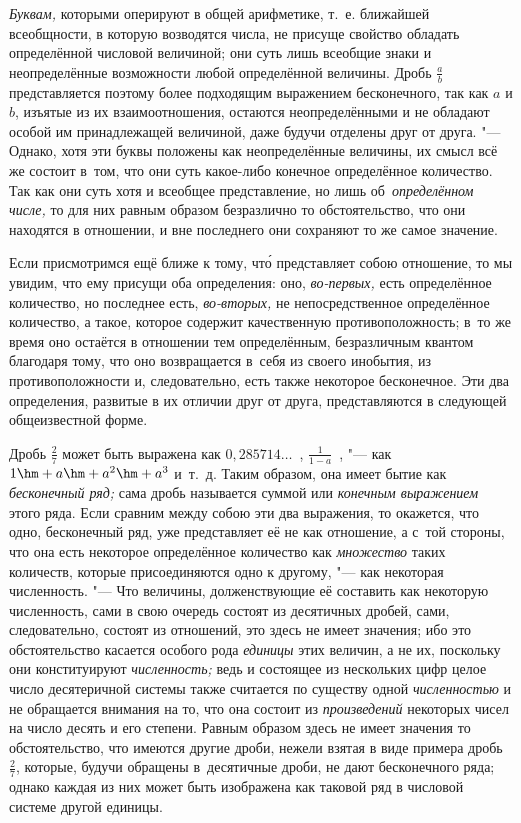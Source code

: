 {\em Буквам,} которыми оперируют в общей арифметике, т.~е. ближайшей
всеобщности, в которую возводятся числа, не присуще свойство обладать
определённой числовой величиной; они суть лишь всеобщие знаки и неопределённые
возможности любой определённой величины. Дробь $\frac a b$ представляется
поэтому более подходящим выражением бесконечного, так как $a$ и $b$,
изъятые из их взаимоотношения, остаются неопределёнными и не обладают особой им
принадлежащей величиной, даже будучи отделены друг от друга. "--- Однако, хотя
эти буквы положены как неопределённые величины, их смысл всё же состоит в~том,
что они суть какое-либо конечное определённое количество. Так как они суть хотя
и всеобщее представление, но лишь об~{\em определённом числе,} то для них
равным образом безразлично то обстоятельство, что они находятся в отношении,
и вне последнего они сохраняют то же самое значение.

Если присмотримся ещё ближе к тому, чт\'{о} представляет собою отношение, то мы
увидим, что ему присущи оба определения: оно, {\em во-первых,} есть
определённое количество, но последнее есть, {\em во-вторых,} не
непосредственное определённое количество, а такое, которое содержит качественную
противоположность; в~то же время оно остаётся в отношении тем определённым,
безразличным квантом благодаря тому, что оно возвращается в~себя из
своего инобытия, из противоположности и, следовательно, есть также
некоторое бесконечное. Эти два определения, развитые в их отличии друг от
друга, представляются в следующей общеизвестной форме.

Дробь $\frac 2 7$ может быть выражена как $0{,}285714\ldots$~,
$\frac 1{1-a}$~, "--- как $1\hm+a\hm+a^2\hm+a^3$ и~т.~д. Таким образом, она
имеет бытие как {\em бесконечный ряд;} сама дробь называется суммой
или {\em конечным выражением} этого ряда. Если сравним между собою эти два
выражения, то окажется, что одно, бесконечный ряд, уже представляет её не как
отношение, а с~той стороны, что она есть некоторое определённое количество как
{\em множество} таких количеств, которые присоединяются одно к другому, "---
как некоторая численность. "--- Что величины, долженствующие её составить как
некоторую численность, сами в свою очередь состоят из десятичных дробей, сами,
следовательно, состоят из отношений, это здесь не имеет значения; ибо это
обстоятельство касается особого рода {\em единицы} этих величин, а не их,
поскольку они конституируют {\em численность;} ведь и состоящее из нескольких
цифр целое число десятеричной системы также считается по существу одной
{\em численностью} и не обращается внимания на то, что она состоит из
{\em произведений} некоторых чисел на число десять и его степени. Равным
образом здесь не имеет значения то обстоятельство, что имеются другие дроби,
нежели взятая в виде примера дробь $\frac 2 7$, которые, будучи обращены
в~десятичные дроби, не дают бесконечного ряда; однако каждая из них может быть
изображена как таковой ряд в числовой системе другой единицы.

